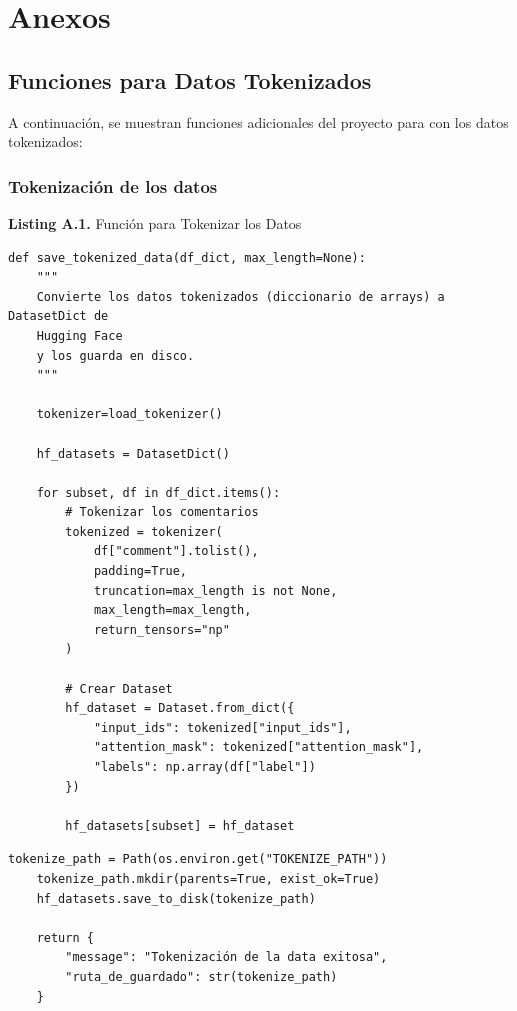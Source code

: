 \chapter{Anexos}

\section{Funciones para Datos Tokenizados}

A continuación, se muestran funciones adicionales del proyecto para con los datos tokenizados:

\subsection{Tokenización de los datos}

\begin{center}
\textbf{Listing A.1.} Función para Tokenizar los Datos
\end{center}

\begin{lstlisting}[style=pythoncode]
def save_tokenized_data(df_dict, max_length=None):
    """
    Convierte los datos tokenizados (diccionario de arrays) a DatasetDict de
    Hugging Face
    y los guarda en disco.
    """

    tokenizer=load_tokenizer()

    hf_datasets = DatasetDict()

    for subset, df in df_dict.items():
        # Tokenizar los comentarios
        tokenized = tokenizer(
            df["comment"].tolist(),
            padding=True,
            truncation=max_length is not None,
            max_length=max_length,
            return_tensors="np"
        )

        # Crear Dataset
        hf_dataset = Dataset.from_dict({
            "input_ids": tokenized["input_ids"],
            "attention_mask": tokenized["attention_mask"],
            "labels": np.array(df["label"])
        })

        hf_datasets[subset] = hf_dataset
\end{lstlisting}


\vspace{0.5cm}

\begin{lstlisting}[style=pythoncode]
    tokenize_path = Path(os.environ.get("TOKENIZE_PATH"))
    tokenize_path.mkdir(parents=True, exist_ok=True)
    hf_datasets.save_to_disk(tokenize_path)

    return {
        "message": "Tokenización de la data exitosa",
        "ruta_de_guardado": str(tokenize_path)
    }
\end{lstlisting}

